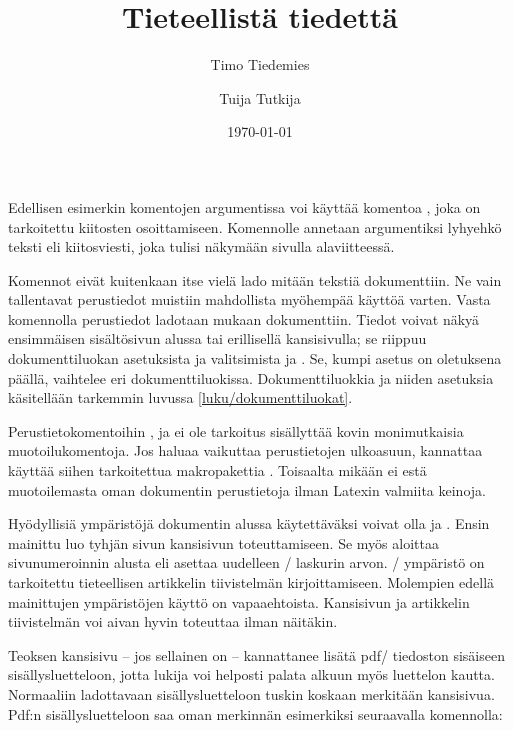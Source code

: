 \begin{koodilohkosis}
\title{Tieteellistä tiedettä}              %
\author{Timo Tiedemies \and Tuija Tutkija} %
\date{\today}                              %
\end{koodilohkosis}

Edellisen esimerkin komentojen argumentissa voi käyttää komentoa
, joka on tarkoitettu kiitosten osoittamiseen.
Komennolle annetaan argumentiksi lyhyehkö teksti eli kiitosviesti, joka
tulisi näkymään sivulla alaviitteessä.

Komennot eivät kuitenkaan itse vielä lado mitään tekstiä dokumenttiin.
Ne vain tallentavat perustiedot muistiin mahdollista myöhempää käyttöä
varten. Vasta komennolla  perustiedot ladotaan
mukaan dokumenttiin. Tiedot voivat näkyä ensimmäisen sisältösivun alussa
tai erillisellä kansisivulla; se riippuu dokumenttiluokan asetuksista ja
valitsimista  ja . Se, kumpi asetus
on oletuksena päällä, vaihtelee eri dokumenttiluokissa.
Dokumenttiluokkia ja niiden asetuksia käsitellään tarkemmin luvussa
\ref{luku/dokumenttiluokat}.

Perustietokomentoihin ,  ja
 ei ole tarkoitus sisällyttää kovin monimutkaisia
muotoilukomentoja. Jos haluaa vaikuttaa perustietojen ulkoasuun,
kannattaa käyttää siihen tarkoitettua makropakettia
. Toisaalta mikään ei estä
muotoilemasta oman dokumentin perustietoja ilman Latexin valmiita
keinoja.

Hyödyllisiä ympäristöjä dokumentin alussa käytettäväksi voivat olla
 ja . Ensin mainittu luo
tyhjän sivun kansisivun toteuttamiseen. Se myös aloittaa sivunumeroinnin
alusta eli asettaa uudelleen \-/ laskurin arvon.
\-/ ympäristö on tarkoitettu tieteellisen artikkelin
tiivistelmän kirjoittamiseen. Molempien edellä mainittujen ympäristöjen
käyttö on vapaaehtoista. Kansisivun ja artikkelin tiivistelmän voi aivan
hyvin toteuttaa ilman näitäkin.

Teoksen kansisivu -- jos sellainen on -- kannattanee lisätä pdf\-/
tiedoston sisäiseen sisällysluetteloon, jotta lukija voi helposti palata
alkuun myös luettelon kautta. Normaaliin ladottavaan sisällysluetteloon
tuskin koskaan merkitään kansisivua. Pdf:n sisällysluetteloon saa oman
merkinnän esimerkiksi seuraavalla komennolla:

